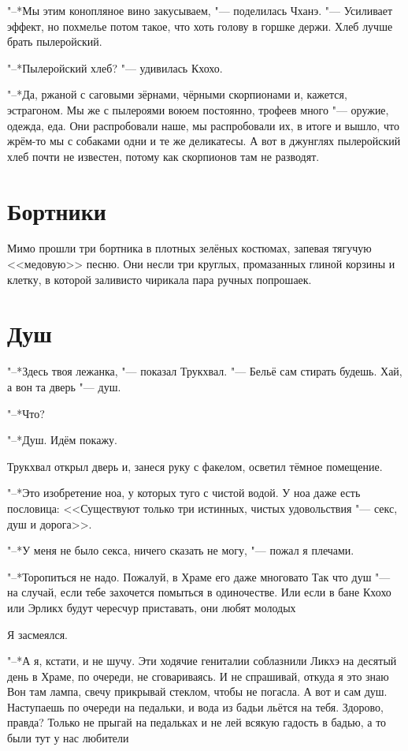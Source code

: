 \documentclass[a4paper,10pt]{book}
\newcommand{\ldotst}{\so{...}\xspace}
\begin{document}
"--*Мы этим конопляное вино закусываем, "--- поделилась Чханэ. "--- Усиливает 
эффект,
но похмелье потом такое, что хоть голову в горшке держи. Хлеб 
лучше брать пылеройский.

"--*Пылеройский хлеб? "--- удивилась Кхохо.

"--*Да, ржаной с саговыми зёрнами, чёрными скорпионами и, кажется, эстрагоном. 
Мы же с пылероями воюем постоянно, трофеев много "--- оружие, одежда, еда. Они 
распробовали наше, мы распробовали их, в итоге и вышло, что жрём-то мы с 
собаками одни и те же деликатесы. А вот в джунглях пылеройский хлеб почти не 
известен, потому как скорпионов там не разводят.
 

 
 
\section{Бортники}
 
Мимо прошли три бортника в плотных зелёных костюмах, запевая тягучую 
<<медовую>> 
песню. Они несли три круглых, промазанных глиной корзины и клетку, в которой 
заливисто чирикала пара ручных попрошаек.
 
\section{Душ}
 
"--*Здесь твоя лежанка, "--- показал Трукхвал. "--- Бельё сам стирать будешь. 
Хай, а вон та дверь "--- душ.

"--*Что?

"--*Душ. Идём покажу.

Трукхвал открыл дверь и, занеся руку с факелом, осветил тёмное помещение.

"--*Это изобретение ноа, у которых туго с чистой водой. У ноа даже есть пословица: <<Существуют только три истинных, чистых удовольствия "--- секс, душ и дорога>>.

"--*У меня не было секса, ничего сказать не могу, "--- пожал я плечами.

"--*Торопиться не надо. Пожалуй, в Храме его даже многовато\ldotst 
Так что душ "--- на случай, если тебе захочется помыться в одиночестве. Или если в бане 
Кхохо или Эрликх будут чересчур приставать, они любят молодых\ldotst

Я засмеялся.

"--*А я, кстати, и не шучу. Эти ходячие гениталии соблазнили Ликхэ на десятый 
день в Храме, по очереди, не сговариваясь. И не спрашивай, откуда я это 
знаю\ldotst Вон там лампа, свечу прикрывай стеклом, чтобы не погасла. А вот и 
сам душ. Наступаешь по очереди на педальки, и вода из бадьи льётся на тебя. 
Здорово, правда? Только не прыгай на педальках и не лей всякую гадость в бадью, 
а то были тут у нас любители\ldotst
\end{document}
